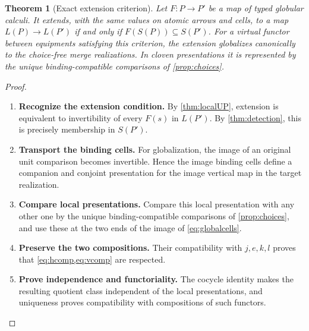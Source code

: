 \documentclass[11pt,reqno]{amsart}
\theoremstyle{plain}
\newtheorem{theorem}{Theorem}[section]
\theoremstyle{definition}
\theoremstyle{remark}
\numberwithin{equation}{section}
\begin{document}
\begin{theorem}[Exact extension criterion]\label{thm:functoriality}
Let $F:P\to P'$ be a map of typed globular calculi. It extends, with
the same values on atomic arrows and cells, to a map $L(P)\to L(P')$
if and only if $F(S(P))\subseteq S(P')$.
For a virtual functor between equipments satisfying this criterion,
the extension globalizes canonically to the choice-free merge realizations.
In cloven presentations it is represented by the unique binding-compatible
comparisons of \cref{prop:choices}.
\end{theorem}
\begin{proof}\leavevmode
\begin{enumerate}
\item \textbf{Recognize the extension condition.} By \cref{thm:localUP}, extension is equivalent to invertibility of
every $F(s)$ in $L(P')$. By \cref{thm:detection}, this is precisely
membership in $S(P')$.

\item \textbf{Transport the binding cells.} For globalization, the image of an original unit comparison becomes
invertible. Hence the image binding cells define a companion and conjoint
presentation for the image vertical map in the target realization.

\item \textbf{Compare local presentations.} Compare
this local presentation with any other one by the unique binding-compatible
comparisons of \cref{prop:choices}, and use these at the two ends of the
image of \cref{eq:globalcells}.

\item \textbf{Preserve the two compositions.} Their compatibility with $j,e,k,l$ proves
that \cref{eq:hcomp,eq:vcomp} are respected.

\item \textbf{Prove independence and functoriality.} The cocycle identity makes
the resulting quotient class independent of the local presentations, and
uniqueness proves compatibility with compositions of such functors.\qedhere
\end{enumerate}
\end{proof}
\end{document}
